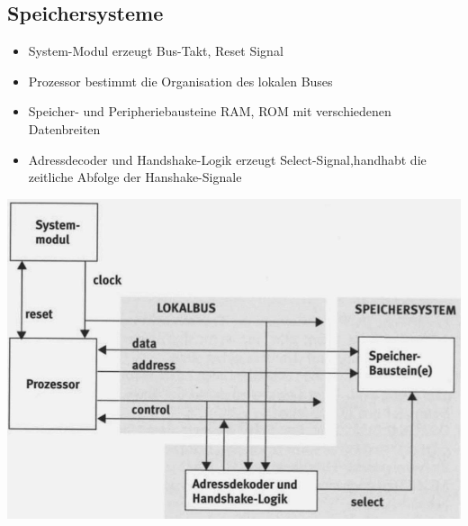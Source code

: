 \clearpage

\begin{minipage}{0.5\linewidth}
    \subsection{Speichersysteme}   
    \begin{itemize}
        \item System-Modul
        \subitem erzeugt Bus-Takt, Reset Signal
        \item Prozessor
        \subitem bestimmt die Organisation des lokalen Buses
        \item Speicher- und Peripheriebausteine
        \subitem RAM, ROM mit verschiedenen Datenbreiten
        \item Adressdecoder und Handshake-Logik
        \subitem erzeugt Select-Signal,handhabt die zeitliche Abfolge der Hanshake-Signale 
    \end{itemize}
\end{minipage}
\begin{minipage}{0.5\linewidth}
    \includegraphics[width=\textwidth]{images/SystembusSpeicherSpeichersystem/SpeicherSysHardwareAuf}
\end{minipage}

